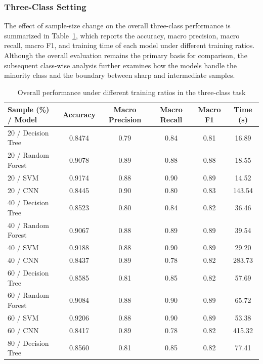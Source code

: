 \subsubsection{Three-Class Setting}

\par The effect of sample-size change on the overall three-class performance is
summarized in Table~\ref{tab:sample-triclass-summary}, which reports the
accuracy, macro precision, macro recall, macro F1, and training time of each
model under different training ratios. Although the overall
evaluation remains the primary basis for comparison, the subsequent class-wise
analysis further examines how the models handle the minority class and the
boundary between sharp and intermediate samples.

\begin{table}[H]
    \centering
    \caption{Overall performance under different training ratios in the three-class task}
    \label{tab:sample-triclass-summary}
    \begin{tabular}{lccccc}
        \toprule
        Sample (\%) / Model & Accuracy & Macro Precision & Macro Recall & Macro F1 & Time (s) \\
        \midrule
        20 / Decision Tree & 0.8474 & 0.79 & 0.84 & 0.81 & 16.89 \\
        20 / Random Forest & 0.9078 & 0.89 & 0.88 & 0.88 & 18.55 \\
        20 / SVM           & 0.9174 & 0.88 & 0.90 & 0.89 & 14.52 \\
        20 / CNN           & 0.8445 & 0.90 & 0.80 & 0.83 & 143.54 \\
        40 / Decision Tree & 0.8523 & 0.80 & 0.84 & 0.82 & 36.46 \\
        40 / Random Forest & 0.9067 & 0.88 & 0.89 & 0.89 & 39.54 \\
        40 / SVM           & 0.9188 & 0.88 & 0.90 & 0.89 & 29.20 \\
        40 / CNN           & 0.8437 & 0.89 & 0.78 & 0.82 & 283.73 \\
        60 / Decision Tree & 0.8585 & 0.81 & 0.85 & 0.82 & 57.69 \\
        60 / Random Forest & 0.9084 & 0.88 & 0.90 & 0.89 & 65.72 \\
        60 / SVM           & 0.9206 & 0.88 & 0.90 & 0.89 & 53.38 \\
        60 / CNN           & 0.8417 & 0.89 & 0.78 & 0.82 & 415.32 \\
        80 / Decision Tree & 0.8560 & 0.81 & 0.85 & 0.82 & 77.41 \\

\end{tabular}
\end{table}

